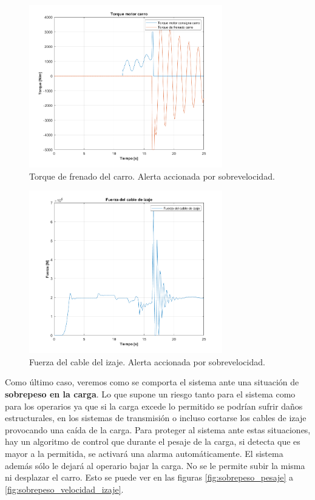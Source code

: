 \documentclass[11pt]{article}
\begin{document}
\begin{figure}[!h]
	\centering
	\includegraphics[width=0.75\textwidth]{images/Freno_sobrevelocidad/torque_motor.png}
	\caption{Torque de frenado del carro. Alerta accionada por sobrevelocidad.}
	\label{fig:sobrevelocidad_torque_motor_carro}
\end{figure}

\begin{figure}[!h]
	\centering
	\includegraphics[width=0.75\textwidth]{images/Freno_sobrevelocidad/fuerza_cable.png}
	\caption{Fuerza del cable del izaje. Alerta accionada por sobrevelocidad.}
	\label{fig:sobrevelocidad_fuerza_cable_izaje}
\end{figure}

\newpage

Como último caso, veremos como se comporta el sistema ante una situación de \textbf{sobrepeso en la carga}. Lo que supone un riesgo tanto para el sistema como para los operarios ya que si la carga excede lo permitido se podrían sufrir daños estructurales, en los sistemas de transmisión o incluso cortarse los cables de izaje provocando una caída de la carga. Para proteger al sistema ante estas situaciones, hay un algoritmo de control que durante el pesaje de la carga, si detecta que es mayor a la permitida, se activará una alarma automáticamente. El sistema además sólo le dejará al operario bajar la carga. No se le permite subir la misma ni desplazar el carro. Esto se puede ver en las figuras \ref{fig:sobrepeso_pesaje} a \ref{fig:sobrepeso_velocidad_izaje}.
\end{document}
